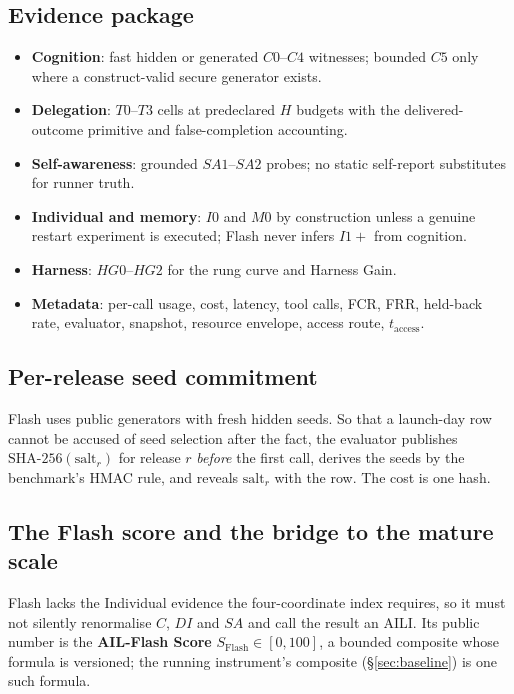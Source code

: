 \documentclass[11pt]{article}
\theoremstyle{definition}
\begin{document}
\subsection{Evidence package}
\begin{itemize}[itemsep=1pt]
\item \textbf{Cognition}: fast hidden or generated $C0$--$C4$ witnesses; bounded $C5$ only where a construct-valid secure generator exists.
\item \textbf{Delegation}: $T0$--$T3$ cells at predeclared $H$ budgets with the delivered-outcome primitive and false-completion accounting.
\item \textbf{Self-awareness}: grounded $SA1$--$SA2$ probes; no static self-report substitutes for runner truth.
\item \textbf{Individual and memory}: $I0$ and $M0$ by construction unless a genuine restart experiment is executed; Flash never infers $I1{+}$ from cognition.
\item \textbf{Harness}: $HG0$--$HG2$ for the rung curve and Harness Gain.
\item \textbf{Metadata}: per-call usage, cost, latency, tool calls, FCR, FRR, held-back rate, evaluator, snapshot, resource envelope, access route, $t_{\text{access}}$.
\end{itemize}

\subsection{Per-release seed commitment}
Flash uses public generators with fresh hidden seeds. So that a launch-day row cannot be accused of seed selection after the fact, the evaluator publishes $\mathrm{SHA\text{-}256}(\text{salt}_r)$ for release $r$ \emph{before} the first call, derives the seeds by the benchmark's HMAC rule, and reveals $\text{salt}_r$ with the row. The cost is one hash.

\subsection{The Flash score and the bridge to the mature scale}
Flash lacks the Individual evidence the four-coordinate index requires, so it must not silently renormalise $C$, $DI$ and $SA$ and call the result an AILI. Its public number is the \textbf{AIL-Flash Score} $S_{\mathrm{Flash}} \in [0, 100]$, a bounded composite whose formula is versioned; the running instrument's composite (\S\ref{sec:baseline}) is one such formula.
\end{document}
